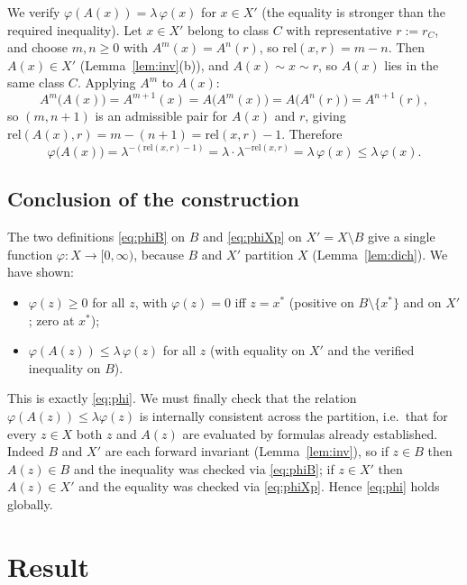\documentclass{amsart}
\theoremstyle{definition}
\begin{document}
We verify $\varphi(A(x))=\lambda\,\varphi(x)$ for $x\in X'$ (the equality is
stronger than the required inequality). Let $x\in X'$ belong to class $C$ with
representative $r:=r_C$, and choose $m,n\ge 0$ with $A^m(x)=A^n(r)$, so
$\mathrm{rel}(x,r)=m-n$. Then $A(x)\in X'$ (Lemma~\ref{lem:inv}(b)), and $A(x)\sim
x\sim r$, so $A(x)$ lies in the same class $C$. Applying $A^m$ to $A(x)$:
\[
  A^{m}\bigl(A(x)\bigr)=A^{m+1}(x)=A\bigl(A^m(x)\bigr)=A\bigl(A^n(r)\bigr)=A^{n+1}(r),
\]
so $(m,n+1)$ is an admissible pair for $A(x)$ and $r$, giving
$\mathrm{rel}(A(x),r)=m-(n+1)=\mathrm{rel}(x,r)-1$. Therefore
\[
  \varphi\bigl(A(x)\bigr)=\lambda^{-(\mathrm{rel}(x,r)-1)}
  =\lambda\cdot\lambda^{-\mathrm{rel}(x,r)}=\lambda\,\varphi(x)
  \le\lambda\,\varphi(x).
\]

\subsection*{Conclusion of the construction}
The two definitions \eqref{eq:phiB} on $B$ and \eqref{eq:phiXp} on
$X'=X\setminus B$ give a single function $\varphi:X\to[0,\infty)$, because $B$ and
$X'$ partition $X$ (Lemma~\ref{lem:dich}). We have shown:
\begin{itemize}
\item $\varphi(z)\ge 0$ for all $z$, with $\varphi(z)=0$ iff $z=x^*$ (positive on
$B\setminus\{x^*\}$ and on $X'$; zero at $x^*$);
\item $\varphi(A(z))\le\lambda\,\varphi(z)$ for all $z$ (with equality on $X'$ and
the verified inequality on $B$).
\end{itemize}
This is exactly \eqref{eq:phi}. We must finally check that the relation
$\varphi(A(z))\le\lambda\varphi(z)$ is internally consistent across the partition,
i.e.\ that for every $z\in X$ both $z$ and $A(z)$ are evaluated by formulas already
established. Indeed $B$ and $X'$ are each forward invariant
(Lemma~\ref{lem:inv}), so if $z\in B$ then $A(z)\in B$ and the inequality was
checked via \eqref{eq:phiB}; if $z\in X'$ then $A(z)\in X'$ and the equality was
checked via \eqref{eq:phiXp}. Hence \eqref{eq:phi} holds globally.

\section{Result}
\end{document}
